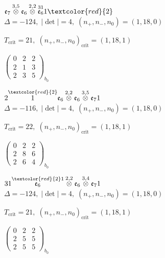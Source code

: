 \documentclass[10pt]{article}
\begin{document}
$\mathfrak{e}_7\overset{3,5}{\otimes}\mathfrak{e}_6\overset{2,2}{\otimes}\overset{31}{\mathfrak{e}_6}1\textcolor{red}{2}$ \quad $\Delta=-124,\; |\det|=4,\; (n_+,n_-,n_0)=(1,18,0)$

\hspace{1em}$T_{\text{crit}}=21,\; (n_+,n_-,n_0)_{\text{crit}}=(1,18,1)$

\hspace{2em}$\left(\begin{smallmatrix}0 & 2 & 2 \\ 2 & 1 & 3 \\ 2 & 3 & 5\end{smallmatrix}\right)_{\!b_0}$

\smallskip

$2\overset{\textcolor{red}{2}}{1}\mathfrak{e}_6\overset{2,2}{\otimes}\mathfrak{e}_6\overset{3,5}{\otimes}\mathfrak{e}_71$ \quad $\Delta=-116,\; |\det|=4,\; (n_+,n_-,n_0)=(1,18,0)$

\hspace{1em}$T_{\text{crit}}=22,\; (n_+,n_-,n_0)_{\text{crit}}=(1,18,1)$

\hspace{2em}$\left(\begin{smallmatrix}0 & 2 & 2 \\ 2 & 8 & 6 \\ 2 & 6 & 4\end{smallmatrix}\right)_{\!b_0}$

\smallskip

$31\overset{\textcolor{red}{2}1}{\mathfrak{e}_6}\overset{2,2}{\otimes}\mathfrak{e}_6\overset{3,4}{\otimes}\mathfrak{e}_71$ \quad $\Delta=-124,\; |\det|=4,\; (n_+,n_-,n_0)=(1,18,0)$

\hspace{1em}$T_{\text{crit}}=21,\; (n_+,n_-,n_0)_{\text{crit}}=(1,18,1)$

\hspace{2em}$\left(\begin{smallmatrix}0 & 2 & 2 \\ 2 & 5 & 5 \\ 2 & 5 & 5\end{smallmatrix}\right)_{\!b_0}$

\smallskip
\end{document}
